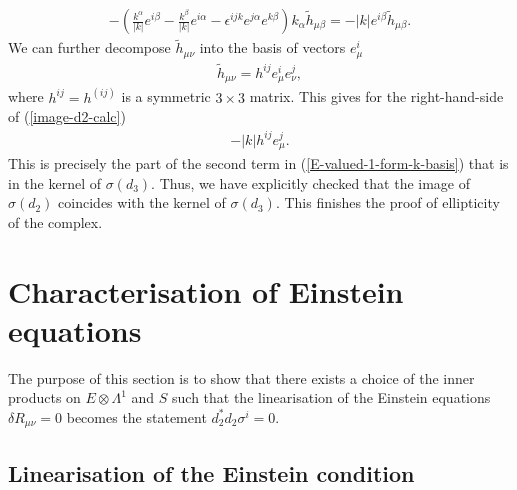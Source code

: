 \documentclass[10pt]{report}
\theoremstyle{definition}
\begin{document}
\begin{align}\label{image-d2-calc}
- \left(\frac{k^\alpha}{|k|} e^{i\beta} - \frac{k^\beta}{|k|} e^{i\alpha} - \epsilon^{ijk} e^{j\alpha} e^{k\beta}\right) k_\alpha \tilde{h}_{\mu\beta} = - |k| e^{i\beta} \tilde{h}_{\mu\beta}.
\end{align}
We can further decompose $\tilde{h}_{\mu\nu}$ into the basis of vectors $e^i_\mu$
\begin{align}
\tilde{h}_{\mu\nu} = h^{ij} e^i_\mu e^j_\nu,
\end{align}
where $h^{ij}=h^{(ij)}$ is a symmetric $3\times 3$ matrix. This gives for the right-hand-side of (\ref{image-d2-calc})
\begin{align}
- |k| h^{ij} e^j_\mu.
\end{align}
This is precisely the part of the second term in (\ref{E-valued-1-form-k-basis}) that is in the kernel of $\sigma(d_3)$. Thus, we have explicitly checked that the image of $\sigma(d_2)$ coincides with the kernel of $\sigma(d_3)$. This finishes the proof of ellipticity of the complex.

\section{Characterisation of Einstein equations}

The purpose of this section is to show that there exists a choice of the inner products on $E\otimes \Lambda^1$ and $S$ such that the linearisation of the Einstein equations $\delta R_{\mu\nu}=0$ becomes the statement $d_2^* d_2 \sigma^i=0$. 

\subsection{Linearisation of the Einstein condition}
\end{document}
